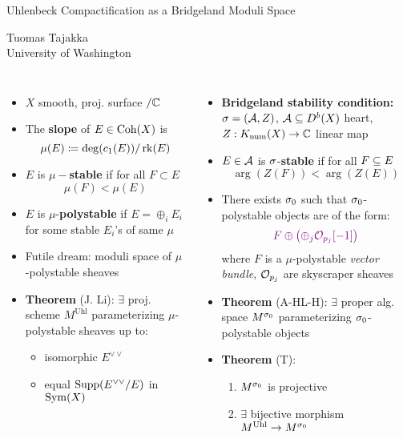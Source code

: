 \documentclass[8pt]{beamer}
\begin{document}
\begin{frame}{Uhlenbeck Compactification as a Bridgeland Moduli Space}
    
\begin{center}
{\large Tuomas Tajakka} \\
University of Washington
\end{center}

\begin{columns}[T]
    
    \begin{itemize}
        \item<2-> $X$ smooth, proj. surface $/\mathbb{C}$
        \item<3-> The {\bf \color{blue} slope} of $E \in \mathrm{Coh}(X)$ is
        \[ \mu(E) \coloneqq \deg(c_1(E))/\operatorname{\mathrm{rk}}(E) \]
        \item<4-> $E$ is {\color{blue} $\mu-${\bf stable}} if for all $F \subset E$
        \[ \mu(F) < \mu(E) \]
        \item<5-> $E$ is {\color{blue} $\mu$-{\bf polystable}} if $E = \oplus_i E_i$ for some stable $E_i$'s of same $\mu$
        \item<6-> Futile dream: moduli space of $\mu$-polystable sheaves
        \item<7-> {\bf Theorem} (J. Li): $\exists$ proj. scheme $M^{\mathrm{Uhl}}$ parameterizing $\mu$-polystable sheaves up to:
        \begin{itemize}
            \item<8-> \color{violet}isomorphic $E^{\vee\vee}$ 
            \item<9-> \color{violet} equal $\operatorname{\mathrm{Supp}}(E^{\vee\vee}/E)$ in $\mathrm{Sym}(X)$
        \end{itemize}
    \end{itemize}
    
    \begin{itemize}
        \item<10-> {\color{blue} \bf Bridgeland stability condition:} $\sigma = (\mathcal{A}, Z)$, $\mathcal{A} \subseteq D^b(X)$ heart, $Z: K_{\mathrm{num}}(X) \to \mathbb{C}$ linear map
        \item<11-> $E \in \mathcal{A}$ is {\color{blue} $\sigma$-{\bf stable}} if for all $F \subseteq E$
        \[ \arg(Z(F)) < \arg(Z(E)) \]
        \item<12-> There exists $\sigma_0$ such that $\sigma_0$-polystable objects are of the form:
        \[ \color{violet} F \oplus \left(\oplus_j \mathcal{O}_{p_j}[-1]\right) \]
        where $F$ is a $\mu$-polystable \emph{vector bundle}, $\mathcal{O}_{p_j}$ are skyscraper sheaves 
        \item<13-> {\bf Theorem} (A-HL-H): $\exists$ proper alg. space $M^{\sigma_0}$ parameterizing $\sigma_0$-polystable objects
        \item<14-> {\bf Theorem} (T):
        \begin{enumerate}
            \item<15-> $M^{\sigma_0}$ is projective
            \item<16-> $\exists$ bijective morphism $M^{\mathrm{Uhl}} \to M^{\sigma_0}$
        \end{enumerate} 
    \end{itemize}
    

\end{columns}
\end{frame}
\end{document}
